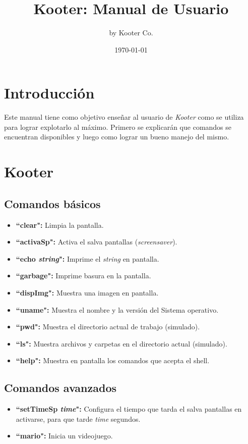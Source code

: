\documentclass[a4paper,11pt]{article}
\title{Kooter: Manual de Usuario}
\author{by Kooter Co.}
\date{\today}
\begin{document}
\maketitle
\newpage
\tableofcontents
\newpage
\section{Introducción}
Este manual tiene como objetivo enseñar al usuario de \emph{Kooter} como se utiliza para lograr explotarlo al máximo. Primero se explicarán que comandos se encuentran disponibles y luego como lograr un bueno manejo del mismo.

\section{Kooter}
\subsection{Comandos básicos}
\begin{itemize}
	\item \textbf{``clear":} Limpia la pantalla.
	\item \textbf{``activaSp":} Activa el salva pantallas (\emph{screensaver}).
	\item \textbf{``echo \emph{string}":} Imprime el \emph{string} en pantalla.
	\item \textbf{``garbage":} Imprime basura en la pantalla.
	\item \textbf{``dispImg":} Muestra una imagen en pantalla.
	\item \textbf{``uname":} Muestra el nombre y la versión del Sistema operativo.
	\item \textbf{``pwd":} Muestra el directorio actual de trabajo (simulado).
	\item \textbf{``ls":} Muestra archivos y carpetas en el directorio actual (simulado).
	\item \textbf{``help":} Muestra en pantalla los comandos que acepta el shell.
	
	
\end{itemize}
\subsection{Comandos avanzados}
\begin{itemize}
	\item \textbf{``setTimeSp \emph{time}":} Configura el tiempo que tarda el salva pantallas en activarse, para que tarde \emph{time} segundos. 
	\item \textbf{``mario":} Inicia un videojuego.
\end{itemize}
\end{document}

